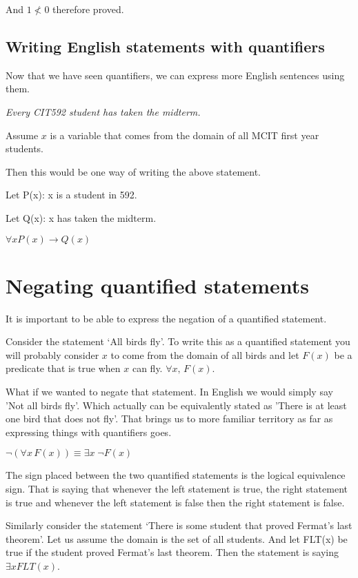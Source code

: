 \documentclass[12pt]{article}
\begin{document}
And $1 \not < 0$ therefore proved.

\subsection*{Writing English statements with quantifiers}

Now that we have seen quantifiers, we can express more English sentences using them.

\medskip

\emph{Every CIT592 student has taken the midterm.}

Assume $x$ is a variable that comes from the domain of all MCIT first year students.

Then this would be one way of writing the above statement.

Let P(x): x is a student in 592.

Let Q(x): x has taken the midterm.

$\forall x P(x) \rightarrow Q(x)$ 

\section*{Negating quantified statements}
It is important to be able to express the negation of a quantified statement.

Consider the statement `All birds fly'. To write this as a quantified statement you will probably consider $x$ to come from the domain of all birds and let $F(x)$ be a predicate that is true when $x$ can fly. $\forall x, \, F(x)$. 

What if we wanted to negate that statement. In English we would simply say 'Not all birds fly'. Which actually can be equivalently stated as 'There is at least one bird that does not fly'. That brings us to more familiar territory as far as expressing things with quantifiers goes. 

$\neg (\forall x \, F(x)) \equiv \exists x \; \neg F(x)$

The sign placed between the two quantified statements is the logical equivalence sign. That is saying that whenever the left statement is true, the right statement is true and whenever the left statement is false then the right statement is false. 

Similarly consider the statement `There is some student that proved Fermat's last theorem'. Let us assume the domain is the set of all students. And let FLT(x) be true if the student proved Fermat's last theorem. Then the statement is saying $\exists x FLT(x)$. 
\end{document}
